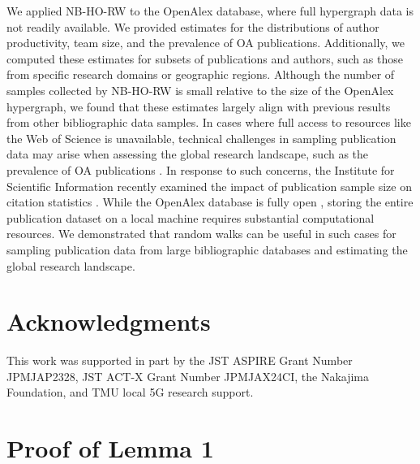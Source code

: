 We applied NB-HO-RW to the OpenAlex database, where full hypergraph data is not readily available.  
We provided estimates for the distributions of author productivity, team size, and the prevalence of OA publications.  
Additionally, we computed these estimates for subsets of publications and authors, such as those from specific research domains or geographic regions.  
Although the number of samples collected by NB-HO-RW is small relative to the size of the OpenAlex hypergraph, we found that these estimates largely align with previous results from other bibliographic data samples.  
In cases where full access to resources like the Web of Science is unavailable, technical challenges in sampling publication data may arise when assessing the global research landscape, such as the prevalence of OA publications \cite{piwowar2018, simard2022}.  
In response to such concerns, the Institute for Scientific Information recently examined the impact of publication sample size on citation statistics \cite{rogers2020}.  
While the OpenAlex database is fully open \cite{priem2022}, storing the entire publication dataset on a local machine requires substantial computational resources.  
We demonstrated that random walks can be useful in such cases for sampling publication data from large bibliographic databases and estimating the global research landscape.

\section*{Acknowledgments}

This work was supported in part by the JST ASPIRE Grant Number JPMJAP2328, JST ACT-X Grant Number JPMJAX24CI, the Nakajima Foundation, and TMU local 5G research support.

\appendix

\def\thesection{Appendix \Alph{section}}

\section{Proof of Lemma 1} \label{appendix:a}

